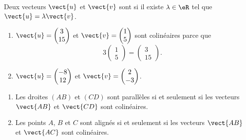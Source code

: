 \begin{definition}
    Deux vecteurs \( \vect{ u }\) et \( \vect{ v }\) sont  si il existe \( \lambda\in \eR\) tel que \( \vect{ u }=\lambda\vect{ v }\).
\end{definition}

\begin{example}
    \begin{enumerate}
        \item
            \( \vect{ u }=\begin{pmatrix}
                3    \\ 
                15    
            \end{pmatrix}\) et \( \vect{ v }=\begin{pmatrix}
                1    \\ 
                5    
            \end{pmatrix}\) sont colinéaires parce que 
            \begin{equation}
                3\begin{pmatrix}
                    1    \\ 
                    5    
                \end{pmatrix}=\begin{pmatrix}
                    3    \\ 
                    15    
                \end{pmatrix}.
            \end{equation}
        \item
            \( \vect{ u }= \begin{pmatrix}
                -8    \\ 
                12    
            \end{pmatrix}\) et \( \vect{ v }=\begin{pmatrix}
                2    \\ 
                -3    
            \end{pmatrix}\).
    \end{enumerate}
\end{example}

\begin{propriete}
    \begin{enumerate}
        \item
            Les droites \( (AB)\) et \( (CD)\) sont parallèles si et seulement si les vecteurs \( \vect{ AB }\) et \( \vect{ CD }\) sont colinéaires.
        \item
            Les points \( A\), \( B\) et \( C\) sont alignés si et seulement si les vecteurs \( \vect{ AB }\) et \( \vect{ AC }\) sont colinéaires.
    \end{enumerate}
\end{propriete}

